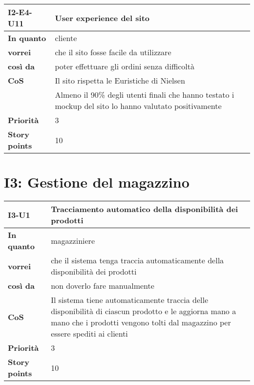 \begin{table}[H]
  \begin{tabularx}{\textwidth}{lX}
    \toprule
    \textbf{I2-E4-U11} & \textbf{User experience del sito} \\
    \midrule
    \textbf{In quanto} & cliente \\
    \textbf{vorrei} & che il sito fosse facile da utilizzare \\
    \textbf{così da} & poter effettuare gli ordini senza difficoltà \\
    \midrule
    \textbf{CoS} & Il sito rispetta le Euristiche di Nielsen \\
    & Almeno il 90\% degli utenti finali che hanno testato i mockup del sito lo hanno valutato positivamente \\
    \midrule
    \textbf{Priorità} & 3 \\
    \textbf{Story points} & 10 \\
    \bottomrule
  \end{tabularx}
  \label{user-story:i2-e4-u11}
\end{table}

\section*{I3: Gestione del magazzino}

\begin{table}[H]
  \begin{tabularx}{\textwidth}{lX}
    \toprule
    \textbf{I3-U1} & \textbf{Tracciamento automatico della disponibilità dei prodotti} \\
    \midrule
    \textbf{In quanto} & magazziniere \\
    \textbf{vorrei} & che il sistema tenga traccia automaticamente della disponibilità dei prodotti \\
    \textbf{così da} & non doverlo fare manualmente \\
    \midrule
    \textbf{CoS} & Il sistema tiene automaticamente traccia delle disponibilità di ciascun prodotto e le aggiorna mano a mano che i prodotti vengono tolti dal magazzino per essere spediti ai clienti \\
    \midrule
    \textbf{Priorità} & 3 \\
    \textbf{Story points} & 10 \\
    \bottomrule
  \end{tabularx}
  \label{user-story:i3-u1}
\end{table}



